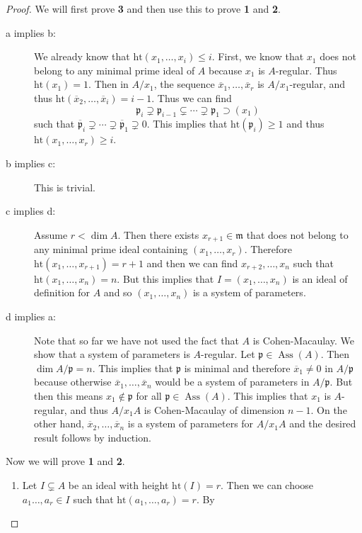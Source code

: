 \documentclass[leqno, openany]{memoir}
\theoremstyle{definition}
\theoremstyle{remark}
\theoremstyle{plain}
\theoremstyle{definition}
\theoremstyle{remark}
\newcommand{\mf}[1]{\mathfrak{#1}}
\newcommand{\mr}[1]{\mathrm{#1}}
\newcommand{\ol}[1]{\overline{#1}}
\DeclareMathOperator{\Ass}{Ass}
\begin{document}
\begin{proof} We will first prove \textbf{3} and then use this to prove
    \textbf{1} and \textbf{2}.  \begin{description} \item[a implies b:] We
        already know that $\mr{ht}(x_1, \ldots, x_i) \leq i$. First, we know
        that $x_1$ does not belong to any minimal prime ideal of $A$ because
        $x_1$ is $A$-regular. Thus $\mr{ht}(x_1) = 1$. Then in $A/x_1$, the
        sequence $\ol{x}_1, \ldots, \ol{x}_r$ is $A/x_1$-regular, and thus
        $\mr{ht}(\ol{x}_2, \ldots, \ol{x}_i) = i-1$. Thus we can find \[
        \mf{p}_i \supsetneq \mf{p}_{i-1} \subsetneq \cdots \supsetneq \mf{p}_1
    \supset (x_1) \] such that $\ol{\mf{p}}_i \supsetneq \cdots \supsetneq
    \ol{\mf{p}}_1 \supsetneq 0$. This implies that $\mr{ht}(\mf{p}_i) \geq 1$
    and thus $\mr{ht}(x_1, \ldots, x_r) \geq i$.  \item[b implies c:] This is
    trivial.  \item[c implies d:] Assume $r < \dim A$. Then there exists
    $x_{r+1} \in \mf{m}$ that does not belong to any minimal prime ideal
    containing $(x_1, \ldots, x_r)$. Therefore $\mr{ht}(x_1, \ldots, x_{r+1}) =
    r+1$ and then we can find $x_{r+2}, \ldots, x_n$ such that $\mr{ht}(x_1,
    \ldots, x_n) = n$. But this implies that $I = (x_1, \ldots, x_n)$ is an
    ideal of definition for $A$ and so $(x_1, \ldots, x_n)$ is a system of
    parameters.  \item[d implies a:] Note that so far we have not used the fact
    that $A$ is Cohen-Macaulay. We show that a system of parameters is
    $A$-regular. Let $\mf{p} \in \Ass(A)$. Then $\dim A/\mf{p} = n$. This
    implies that $\mf{p}$ is minimal and therefore $\ol{x}_1 \neq 0$ in
    $A/\mf{p}$ because otherwise $\ol{x}_1, \ldots, \ol{x}_n$ would be a system
    of parameters in $A/\mf{p}$. But then this means $x_1 \notin \mf{p}$ for
    all $\mf{p} \in \Ass(A)$. This implies that $x_1$ is $A$-regular, and thus
    $A/x_1 A$ is Cohen-Macaulay of dimension $n-1$. On the other hand,
    $\ol{x}_2, \ldots, \ol{x}_n$ is a system of parameters for $A/x_1 A$ and
    the desired result follows by induction.  \end{description} Now we will
    prove \textbf{1} and \textbf{2}.  \begin{enumerate} \item Let $I \subsetneq
        A$ be an ideal with height $\mr{ht}(I) = r$. Then we can choose $a_1
        \ldots, a_r \in I$ such that $\mr{ht}(a_1, \ldots, a_r) = r$. By

\end{enumerate}
\end{proof}
\end{document}
